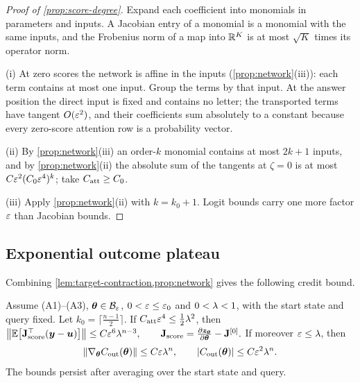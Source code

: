 \begin{proof}[Proof of \cref{prop:score-degree}]
Expand each coefficient into monomials in parameters and inputs. A Jacobian entry of a monomial is a monomial with the same inputs, and the
Frobenius norm of a map into $\mathbb R^K$ is at most $\sqrt K$ times its operator norm.

\noindent(i) At zero scores the network is affine in the inputs (\cref{prop:network}(iii)): each term contains at most one input. Group the terms by
that input. At the answer position the direct input is fixed and contains no letter; the transported terms have tangent $O(\varepsilon^2)$, and
their coefficients sum absolutely to a constant because every zero-score attention row is a probability vector.

\noindent(ii) By \cref{prop:network}(iii) an order-$k$ monomial contains at most $2k+1$ inputs, and by \cref{prop:network}(ii) the absolute sum of the
tangents at $\zeta=0$ is at most $C\varepsilon^2(C_0\varepsilon^4)^k$; take $C_{\mathrm{att}}\ge C_0$.

\noindent(iii) Apply \cref{prop:network}(ii) with $k=k_0+1$. Logit bounds carry one more factor $\varepsilon$ than Jacobian bounds.
\end{proof}

\subsection{Exponential outcome plateau}
\label{app:thm1}

Combining \cref{lem:target-contraction,prop:network} gives the following credit bound.

\begin{lemma}
\label{lem:score-sum}
Assume (A1)--(A3), $\bm\theta\in\mathcal B_{\varepsilon}$, $0<\varepsilon\le\varepsilon_0$ and $0<\lambda<1$, with the start state and query fixed. Let
$k_0=\lceil\frac{n-1}{2}\rceil$. If $C_{\mathrm{att}}\varepsilon^4\le\frac{1}{2}\lambda^2$, then
 $\bigl\|\E\bigl[\mathbf J_{\mathrm{score}}^\top(\bm y-\bm u)\bigr]\bigr\|\le C\initscale^6\mixrate^{n-3},\qquad \mathbf J_{\mathrm{score}}=\Jz-\mathbf J^{[0]}.$ 
If moreover $\varepsilon\le\lambda$, then
\begin{equation}
 \|\nabla_{\bm\theta}C_{\mathrm{out}}(\bm\theta)\|\le C\varepsilon\lambda^n,\qquad |C_{\mathrm{out}}(\bm\theta)|\le C\varepsilon^2\lambda^n.
 \label{eq:thm1-full}
\end{equation}
The bounds persist after averaging over the start state and query.
\end{lemma}

